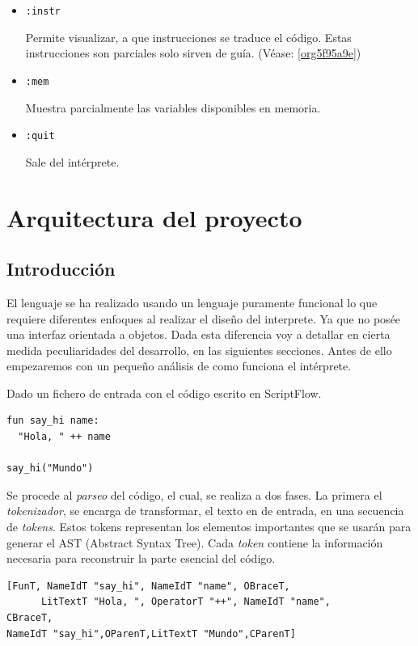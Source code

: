 \documentclass[11pt]{article}
\begin{document}
\begin{itemize}
\item \texttt{:instr}

Permite visualizar, a que instrucciones se traduce el código. Estas
instrucciones son parciales solo sirven de guía. (Véase: \ref{org5f95a9e})

\item \texttt{:mem}

Muestra parcialmente las variables disponibles en memoria.

\item \texttt{:quit}

Sale del intérprete.
\end{itemize}

\section{Arquitectura del proyecto}
\label{sec:org8fed9d2}

\subsection{Introducción}
\label{sec:org1281b1a}

El lenguaje se ha realizado usando un lenguaje puramente funcional lo que
requiere diferentes enfoques al realizar el diseño del interprete. Ya que
no posée una interfaz orientada a objetos. Dada esta diferencia voy a
detallar en cierta medida peculiaridades del desarrollo, en las siguientes
secciones. Antes de ello empezaremos con un pequeño análisis de como
funciona el intérprete.

Dado un fichero de entrada con el código escrito en ScriptFlow.

\begin{verbatim}
fun say_hi name:
  "Hola, " ++ name

say_hi("Mundo")
\end{verbatim}


Se procede al \emph{parseo} del código, el cual, se realiza a dos fases. La primera el
\emph{tokenizador}, se encarga de transformar, el texto en de entrada, en una
secuencia de \emph{tokens}. Estos tokens representan los elementos importantes
que se usarán para generar el AST (Abstract Syntax Tree). Cada \emph{token} contiene la información
necesaria para reconstruir la parte esencial del código.

\begin{verbatim}
[FunT, NameIdT "say_hi", NameIdT "name", OBraceT,
      LitTextT "Hola, ", OperatorT "++", NameIdT "name",
CBraceT,
NameIdT "say_hi",OParenT,LitTextT "Mundo",CParenT]
\end{verbatim}
\end{document}
